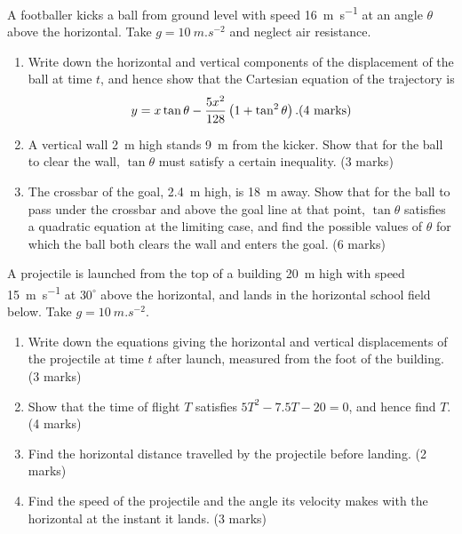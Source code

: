 \documentclass[11pt]{article}
\newcounter{popsec}
\newcounter{popsub}
\newcommand{\courssub}[1]{%
  \stepcounter{popsub}%
  \par\vspace{9pt}\noindent{\popxbold\fontsize{11.5}{13}\selectfont\color{popink}{\color{poporange}\thepopsec.\thepopsub}\hspace{6pt}#1}\par\nopagebreak\vspace{4pt}
}
\begin{document}
\courssub{I prepare for the GCE}

\begin{exercice}
A footballer kicks a ball from ground level with speed \SI{16}{m.s^{-1}} at an angle $\theta$ above the horizontal. Take $g = \SI{10}{m.s^{-2}}$ and neglect air resistance.
\begin{enumerate}
\item Write down the horizontal and vertical components of the displacement of the ball at time $t$, and hence show that the Cartesian equation of the trajectory is
\[ y = x\tan\theta - \frac{5x^2}{128}\left(1 + \tan^2\theta\right). \hfill \text{(4 marks)} \]
\item A vertical wall \SI{2}{m} high stands \SI{9}{m} from the kicker. Show that for the ball to clear the wall, $\tan\theta$ must satisfy a certain inequality. \hfill (3 marks)
\item The crossbar of the goal, \SI{2.4}{m} high, is \SI{18}{m} away. Show that for the ball to pass under the crossbar and above the goal line at that point, $\tan\theta$ satisfies a quadratic equation at the limiting case, and find the possible values of $\theta$ for which the ball both clears the wall and enters the goal. \hfill (6 marks)
\end{enumerate}
\end{exercice}

\begin{exercice}
A projectile is launched from the top of a building \SI{20}{m} high with speed \SI{15}{m.s^{-1}} at $30^\circ$ above the horizontal, and lands in the horizontal school field below. Take $g = \SI{10}{m.s^{-2}}$.
\begin{enumerate}
\item Write down the equations giving the horizontal and vertical displacements of the projectile at time $t$ after launch, measured from the foot of the building. \hfill (3 marks)
\item Show that the time of flight $T$ satisfies $5T^2 - 7.5T - 20 = 0$, and hence find $T$. \hfill (4 marks)
\item Find the horizontal distance travelled by the projectile before landing. \hfill (2 marks)
\item Find the speed of the projectile and the angle its velocity makes with the horizontal at the instant it lands. \hfill (3 marks)
\end{enumerate}
\end{exercice}
\end{document}
